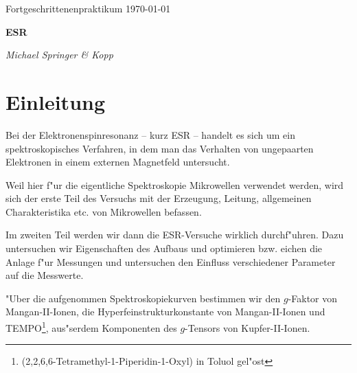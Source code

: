 \documentclass[a4paper,12pt]{article}
\begin{document}
\newcommand{\NAME}{Michael Springer \& Kopp }
\newcommand{\FACH}{Fortgeschrittenenpraktikum}
\newcommand{\TITEL}{ESR}
\newcommand{\DATUM}{\today}


\pagestyle{plain} 




\sloppy

\begin{center}
\FACH
\hfill
\DATUM
\end{center}

\vspace{-5mm} %

\begin{center}
  \begin{Large}
 \textbf{\TITEL}
  \end{Large}
\end{center}

\vspace{-3mm}

\begin{center}
\hrulefill
\quad 
\textit{\NAME}
\,
\hrulefill
\end{center}
 
 








\section{Einleitung}

Bei der Elektronenspinresonanz -- kurz ESR -- handelt es sich um ein
spektroskopisches Verfahren, in dem man das Verhalten von ungepaarten
Elektronen in einem externen Magnetfeld untersucht.

Weil hier f"ur die eigentliche Spektroskopie Mikrowellen verwendet
werden, wird sich der erste Teil des Versuchs mit der Erzeugung,
Leitung, allgemeinen Charakteristika etc. von Mikrowellen befassen.

Im zweiten Teil werden wir dann die ESR-Versuche wirklich
durchf"uhren. Dazu untersuchen wir Eigenschaften des Aufbaus und
optimieren bzw. eichen die Anlage f"ur Messungen und untersuchen den
Einfluss verschiedener Parameter auf die Messwerte.

"Uber die aufgenommen Spektroskopiekurven bestimmen wir den $g$-Faktor
von Mangan-II-Ionen, die Hyperfeinstrukturkonstante von
Mangan-II-Ionen und
TEMPO\footnote{(2,2,6,6-Tetramethyl-1-Piperidin-1-Oxyl) in Toluol
  gel"ost}, aus"serdem Komponenten des $g$-Tensors von
Kupfer-II-Ionen.
\end{document}
